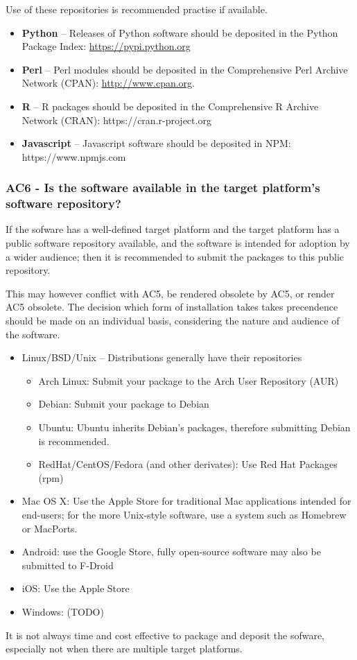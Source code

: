 \documentclass[a4paper,11pt]{article}
\begin{document}
Use of these repositories is recommended practise if available.

\begin{itemize}
    \item \textbf{Python} -- Releases of Python software should be deposited in
        the Python Package Index: \url{https://pypi.python.org}
    \item \textbf{Perl} --  Perl modules should be deposited in the Comprehensive
        Perl Archive Network (CPAN): \url{http://www.cpan.org}.
    \item \textbf{R} -- R packages should be deposited in the Comprehensive R
        Archive Network (CRAN): https://cran.r-project.org
    \item \textbf{Javascript} -- Javascript software should be deposited in
        NPM: https://www.npmjs.com
\end{itemize}

\subsubsection{AC6 - Is the software available in the target platform's software repository?}

If the sofware has a well-defined target platform and the target platform has a
public software repository available, and the software is intended for adoption by a
wider audience; then it is recommended to submit the packages to this public
repository.

This may however conflict with AC5, be rendered obsolete by AC5, or render AC5
obsolete. The decision which form of installation takes takes precendence should be
made on an individual basis, considering the nature and audience of the
software.

\begin{itemize}
    \item Linux/BSD/Unix -- Distributions generally have their repositories
    \begin{itemize}
        \item Arch Linux: Submit your package to the Arch User Repository (AUR)
        \item Debian: Submit your package to Debian
        \item Ubuntu: Ubuntu inherits Debian's packages, therefore submitting Debian is recommended.
        \item RedHat/CentOS/Fedora (and other derivates): Use Red Hat Packages (rpm)
    \end{itemize}
    \item Mac OS X: Use the Apple Store for traditional Mac applications intended for end-users; for the more Unix-style
        software, use a system such as Homebrew or MacPorts.
    \item Android: use the Google Store, fully open-source software may also be
        submitted to F-Droid
    \item iOS: Use the Apple Store
    \item Windows: (TODO) 
\end{itemize}

It is not always time and cost effective to package and deposit the sofware, especially not
when there are multiple target platforms. 
\end{document}
